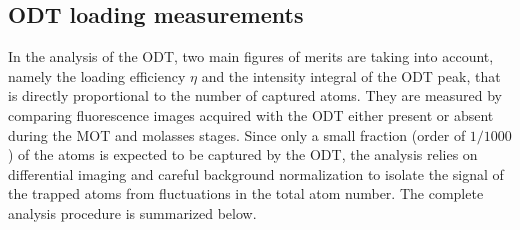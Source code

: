 \subsection{ODT loading measurements}\label{subsec:odt_loading_analysis_method}
In the analysis of the ODT, two main figures of merits are taking into account, namely the loading efficiency $\eta$ and the intensity integral of the ODT peak, that is directly proportional to the number of captured atoms. They are measured by comparing fluorescence images acquired with the ODT either present or absent during the MOT and molasses stages. Since only a small fraction (order of $1/1000$) of the atoms is expected to be captured by the ODT, the analysis relies on differential imaging and careful background normalization to isolate the signal of the trapped atoms from fluctuations in the total atom number. The complete analysis procedure is summarized below.

